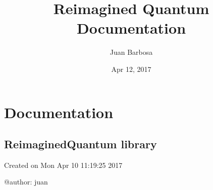 \documentclass[letterpaper,10pt,english]{sphinxmanual}
\title{Reimagined Quantum Documentation}
\date{Apr 12, 2017}
\author{Juan Barbosa}
\begin{document}
\maketitle
\sphinxtableofcontents
{}\label{\detokenize{index::doc}}



\chapter{Documentation}
\label{\detokenize{code::doc}}\label{\detokenize{code:welcome-to-reimagined-quantum-s-documentation}}\label{\detokenize{code:documentation}}

\section{ReimaginedQuantum library}
\label{\detokenize{code:reimaginedquantum-library}}\label{\detokenize{code:module-reimaginedQuantum}}
Created on Mon Apr 10 11:19:25 2017

@author: juan
\end{document}
